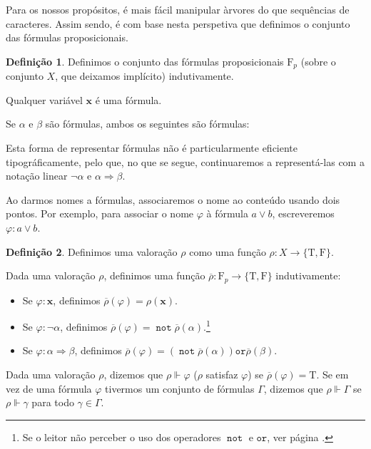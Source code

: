 \documentclass{report}
\theoremstyle{definition}
\newtheorem{definicao}{Definição}
\theoremstyle{remark}
\renewcommand{\bf}[1]{\mathbf{#1}}
\newcommand{\F}{\mathrm{F}}
\newcommand{\lt}{\mathrm{T}}
\newcommand{\lf}{\mathrm{F}}
\DeclareMathOperator{\pnot}{\texttt{not}}
\newcommand{\por}{\mathbin{\texttt{or}}}
\begin{document}
	Para os nossos propósitos, é mais fácil manipular àrvores do que sequências de caracteres. Assim sendo, é com base nesta perspetiva que definimos o conjunto das fórmulas proposicionais.
	
	\begin{definicao}
	Definimos o conjunto das fórmulas proposicionais $\F_p$ (sobre o conjunto $X$, que deixamos implícito) indutivamente.
	
	Qualquer variável $\bf x$ é uma fórmula.
	
	Se $\alpha$ e $\beta$ são fórmulas, ambos os seguintes são fórmulas:
	
	\begin{center}
	\hspace{3em}
	\end{center}
	
	Esta forma de representar fórmulas não é particularmente eficiente tipográficamente, pelo que, no que se segue, continuaremos a representá-las com a notação linear $\neg \alpha$ e $\alpha \Rightarrow \beta$.
	
	Ao darmos nomes a fórmulas, associaremos o nome ao conteúdo usando dois pontos. Por exemplo, para associar o nome $\varphi$ à fórmula $a \lor b$, escreveremos $\varphi : a \lor b$.
	\end{definicao}
	
	\begin{definicao}
	Definimos uma valoração $\rho$ como uma função $\rho : X \to \{\lt,\lf\}$.
	
	Dada uma valoração $\rho$, definimos uma função $\overline\rho : \F_p \to \{\lt, \lf\}$ indutivamente:
	
	\begin{itemize}
	\item Se $\varphi : \bf x$, definimos $\overline\rho(\varphi) = \rho(\bf x)$.
	
	\item Se $\varphi : \neg \alpha$, definimos $\overline\rho(\varphi) = \pnot \overline\rho(\alpha)$.\footnote{Se o leitor não perceber o uso dos operadores $\pnot$ e $\por$, ver página \pageref{tabela:operadores}.}
	
	\item Se $\varphi : \alpha \Rightarrow \beta$, definimos $\overline\rho(\varphi) = (\pnot \overline\rho(\alpha)) \por \overline\rho(\beta)$.
	\end{itemize}
	
	Dada uma valoração $\rho$, dizemos que $\rho \Vdash \varphi$ ($\rho$ satisfaz $\varphi$) se $\overline\rho(\varphi) = \lt$. Se em vez de uma fórmula $\varphi$ tivermos um conjunto de fórmulas $\Gamma$, dizemos que $\rho \Vdash \Gamma$ se $\rho \Vdash \gamma$ para todo $\gamma \in \Gamma$.
	\end{definicao}
	
\end{document}
